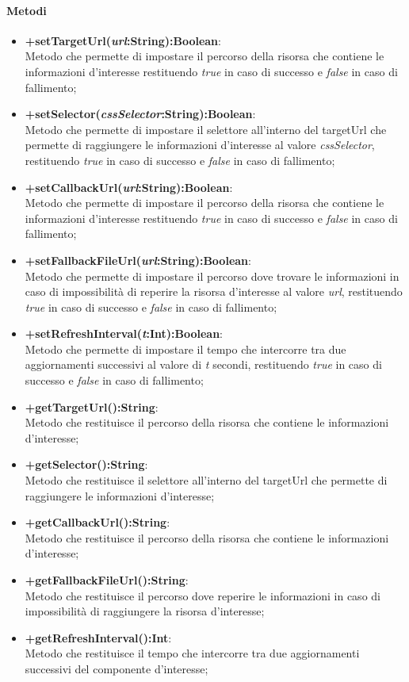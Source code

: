 	\paragraph{Metodi}
	\begin{itemize}
	\item \textbf{+setTargetUrl(\textit{url}:String):Boolean}:\\
		Metodo che permette di impostare il percorso della risorsa che contiene le informazioni d'interesse restituendo \textit{true} in caso di successo e \textit{false} in caso di fallimento;
	\item \textbf{+setSelector(\textit{cssSelector}:String):Boolean}:\\
		Metodo che permette di impostare il selettore all'interno del targetUrl che permette di raggiungere le informazioni d'interesse al valore \textit{cssSelector}, restituendo \textit{true} in caso di successo e \textit{false} in caso di fallimento;
	\item \textbf{+setCallbackUrl(\textit{url}:String):Boolean}:\\
		Metodo che permette di impostare il percorso della risorsa che contiene le informazioni d'interesse restituendo \textit{true} in caso di successo e \textit{false} in caso di fallimento;
	\item \textbf{+setFallbackFileUrl(\textit{url}:String):Boolean}:\\
		Metodo che permette di impostare il percorso dove trovare le informazioni in caso di impossibilità di reperire la risorsa d'interesse al valore \textit{url}, restituendo \textit{true} in caso di successo e \textit{false} in caso di fallimento;
	\item \textbf{+setRefreshInterval(\textit{t}:Int):Boolean}:\\
		Metodo che permette di impostare il tempo che intercorre tra due aggiornamenti successivi al valore di \textit{t} secondi, restituendo \textit{true} in caso di successo e \textit{false} in caso di fallimento;
					
							
	\item \textbf{+getTargetUrl():String}:\\
		Metodo che restituisce il percorso della risorsa che contiene le informazioni d'interesse;
	\item \textbf{+getSelector():String}:\\
		Metodo che restituisce il selettore all'interno del targetUrl che permette di raggiungere le informazioni d'interesse;			
	\item \textbf{+getCallbackUrl():String}:\\
		Metodo che restituisce il percorso della risorsa che contiene le informazioni d'interesse;
	\item \textbf{+getFallbackFileUrl():String}:\\
		Metodo che restituisce il percorso dove reperire le informazioni in caso di impossibilità di raggiungere la risorsa d'interesse;
	\item \textbf{+getRefreshInterval():Int}:\\
		Metodo che restituisce il tempo che intercorre tra due aggiornamenti successivi del componente d'interesse;			



\end{itemize}

